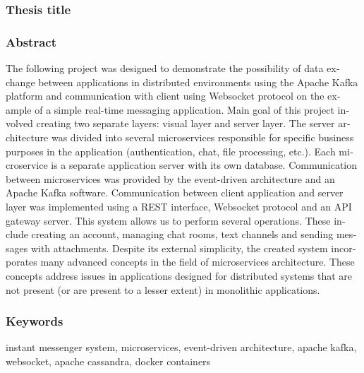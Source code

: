\begin{otherlanguage}{british}

  \subsubsection*{Thesis title}
  \TitleAlt

  \subsubsection*{Abstract}
  The following project was designed to demonstrate the possibility of data exchange between applications in distributed
  environments using the Apache Kafka platform and communication with client using Websocket protocol on the example of
  a simple real-time messaging application. Main goal of this project involved creating two separate layers: visual
  layer and server layer. The server architecture was divided into several microservices responsible for specific
  business purposes in the application (authentication, chat, file processing, etc.). Each microservice is a separate
  application server with its own database. Communication between microservices was provided by the event-driven
  architecture and an Apache Kafka software. Communication between client application and server layer was implemented
  using a REST interface, Websocket protocol and an API gateway server. This system allows us to perform several
  operations. These include creating an account, managing chat rooms, text channels and sending messages with
  attachments. Despite its external simplicity, the created system incorporates many advanced concepts in the field of
  microservices architecture. These concepts address issues in applications designed for distributed systems that are
  not present (or are present to a lesser extent) in monolithic applications.

  \subsubsection*{Keywords}
  instant messenger system, microservices, event-driven architecture, apache kafka, websocket, apache cassandra, docker
  containers

\end{otherlanguage}
